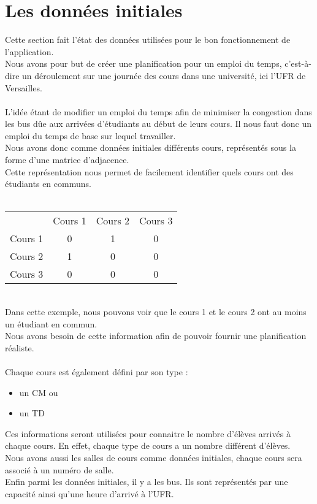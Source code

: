 \documentclass[a4paper,11pt]{article}
\begin{document}
\section{Les données initiales}
	Cette section fait l'état des données utilisées pour le bon fonctionnement de l'application.\\
	Nous avons pour but de créer une planification pour un emploi du temps, c'est-à-dire un déroulement sur une journée des cours dans une université, ici l'UFR de Versailles.\\
	\\
	L'idée étant de modifier un emploi du temps afin de minimiser la congestion dans les bus dûe aux arrivées d'étudiants au début de leurs cours. Il nous faut donc un emploi du temps de base sur lequel travailler.\\
	Nous avons donc comme données initiales différents cours, représentés sous la forme d'une matrice d'adjacence. \\
	Cette représentation nous permet de facilement identifier quels cours ont des étudiants en communs.\\
	\\
	\begin{tabular}{ | c | c | c | c |}
		\hline			
		\       & Cours 1 & Cours 2 & Cours 3\\
		Cours 1 &   0     &    1    &     0  \\
		Cours 2 &   1     &    0    &     0  \\
		Cours 3 &   0     &    0    &     0  \\
		\hline  
	\end{tabular}\\
	Dans cette exemple, nous pouvons voir que le cours 1 et le cours 2 ont au moins un étudiant en commun.\\
	Nous avons besoin de cette information afin de pouvoir fournir une planification réaliste.\\
	\\
	Chaque cours est également défini par son type :
	\begin{itemize}
		\item un CM ou
		\item  un TD
	\end{itemize}
	Ces informations seront utilisées pour connaitre le nombre d'élèves arrivés à chaque cours. En effet, chaque type de cours a un nombre différent d'élèves.\\
	Nous avons aussi les salles de cours comme données initiales, chaque cours sera associé à un numéro de salle.
	\\
	Enfin parmi les données initiales, il y a les bus. Ils sont représentés par une capacité ainsi qu'une heure d'arrivé à l'UFR.
	
\end{document}
